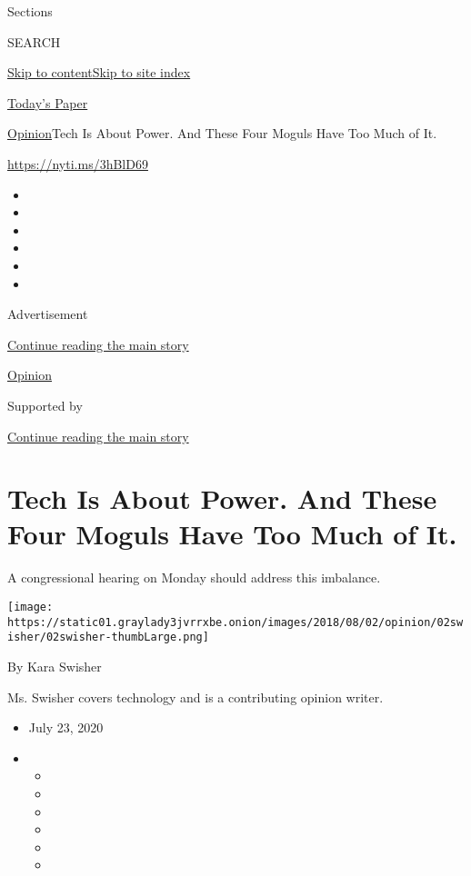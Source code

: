 Sections

SEARCH

\protect\hyperlink{site-content}{Skip to
content}\protect\hyperlink{site-index}{Skip to site index}

\href{https://myaccount.nytimes3xbfgragh.onion/auth/login?response_type=cookie\&client_id=vi}{}

\href{https://www.nytimes3xbfgragh.onion/section/todayspaper}{Today's
Paper}

\href{/section/opinion}{Opinion}\textbar{}Tech Is About Power. And These
Four Moguls Have Too Much of It.

\url{https://nyti.ms/3hBlD69}

\begin{itemize}
\item
\item
\item
\item
\item
\item
\end{itemize}

Advertisement

\protect\hyperlink{after-top}{Continue reading the main story}

\href{/section/opinion}{Opinion}

Supported by

\protect\hyperlink{after-sponsor}{Continue reading the main story}

\hypertarget{tech-is-about-power-and-these-four-moguls-have-too-much-of-it}{%
\section{Tech Is About Power. And These Four Moguls Have Too Much of
It.}\label{tech-is-about-power-and-these-four-moguls-have-too-much-of-it}}

A congressional hearing on Monday should address this imbalance.

\texttt{[image: https://static01.graylady3jvrrxbe.onion/images/2018/08/02/opinion/02swisher/02swisher-thumbLarge.png]}

By Kara Swisher

Ms. Swisher covers technology and is a contributing opinion writer.

\begin{itemize}
\item
  July 23, 2020
\item
  \begin{itemize}
  \item
  \item
  \item
  \item
  \item
  \item
  \end{itemize}
\end{itemize}

